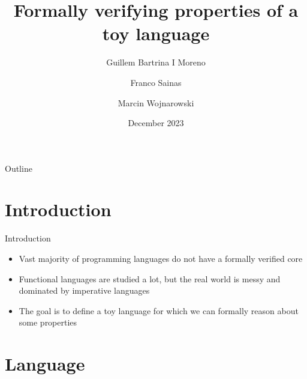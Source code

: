 \documentclass{EESD}
\author{
	Guillem Bartrina I Moreno \and
	Franco Sainas \and
	Marcin Wojnarowski
}
\title[Formal properties of a toy language]{Formally verifying properties of a toy language}
\institute[ENAC]{{\'Ecole Polytechnique F\'ed\'erale de Lausanne (EPFL)}{\newline\newline CS550 - Formal Verification}}
\date{December 2023}
\begin{document}
{
\usebackgroundtemplate{}
\coverpage{
    \titlepage{~}
}
}





\begin{frame}{Outline}
    \begin{multicols}{2}
        \tableofcontents
    \end{multicols}
\end{frame}

\section{Introduction}

\begin{frame}{Introduction}
    \begin{itemize}
        \item Vast majority of programming languages do not have a formally verified core 
        \item Functional languages are studied a lot, but the real world is messy and dominated by imperative languages
        \item The goal is to define a toy language for which we can formally reason about some properties
    \end{itemize}
\end{frame}


\section{Language}
\end{document}
